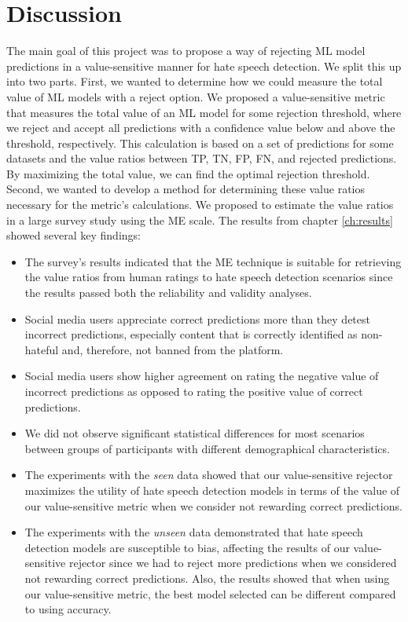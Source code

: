 \chapter{Discussion}
\label{ch:discussion}
The main goal of this project was to propose a way of rejecting ML model predictions in a value-sensitive manner for hate speech detection.
%
We split this up into two parts.
%
First, we wanted to determine how we could measure the total value of ML models with a reject option.
%
We proposed a value-sensitive metric that measures the total value of an ML model for some rejection threshold, where we reject and accept all predictions with a confidence value below and above the threshold, respectively.
%
This calculation is based on a set of predictions for some datasets and the value ratios between TP, TN, FP, FN, and rejected predictions.
%
By maximizing the total value, we can find the optimal rejection threshold.
%
Second, we wanted to develop a method for determining these value ratios necessary for the metric's calculations.
%
We proposed to estimate the value ratios in a large survey study using the ME scale.
%
The results from chapter \ref{ch:results} showed several key findings:
\begin{itemize}
    \item The survey's results indicated that the ME technique is suitable for retrieving the value ratios from human ratings to hate speech detection scenarios since the results passed both the reliability and validity analyses.
    \item Social media users appreciate correct predictions more than they detest incorrect predictions, especially content that is correctly identified as non-hateful and, therefore, not banned from the platform.
    \item Social media users show higher agreement on rating the negative value of incorrect predictions as opposed to rating the positive value of correct predictions.
    \item We did not observe significant statistical differences for most scenarios between groups of participants with different demographical characteristics.
    \item The experiments with the \emph{seen} data showed that our value-sensitive rejector maximizes the utility of hate speech detection models in terms of the value of our value-sensitive metric when we consider not rewarding correct predictions.
    \item The experiments with the \emph{unseen} data demonstrated that hate speech detection models are susceptible to bias, affecting the results of our value-sensitive rejector since we had to reject more predictions when we considered not rewarding correct predictions. Also, the results showed that when using our value-sensitive metric, the best model selected can be different compared to using accuracy.
\end{itemize}
%

